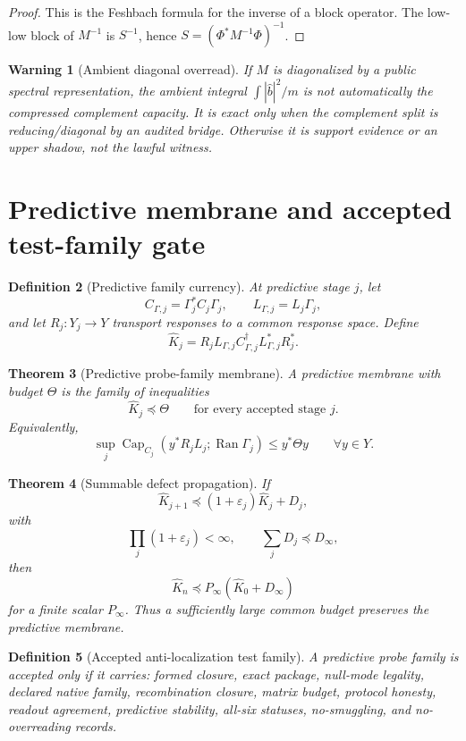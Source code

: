 \documentclass[11pt]{article}
\newtheorem{theorem}{Theorem}[section]
\newtheorem{definition}[theorem]{Definition}
\newtheorem{warning}[theorem]{Warning}
\DeclareMathOperator{\range}{Ran}
\DeclareMathOperator{\Capacity}{Cap}
\newcommand{\eps}{\varepsilon}
\begin{document}
\begin{proof}
This is the Feshbach formula for the inverse of a block operator.  The low-low block of \(M^{-1}\) is \(S^{-1}\), hence \(S=(\Phi^*M^{-1}\Phi)^{-1}\).
\end{proof}

\begin{warning}[Ambient diagonal overread]
If \(M\) is diagonalized by a public spectral representation, the ambient integral \(\int|\widehat b|^2/m\) is not automatically the compressed complement capacity.  It is exact only when the complement split is reducing/diagonal by an audited bridge.  Otherwise it is support evidence or an upper shadow, not the lawful witness.
\end{warning}

\section{Predictive membrane and accepted test-family gate}

\begin{definition}[Predictive family currency]
At predictive stage \(j\), let
\[
  C_{\Gamma,j}=\Gamma_j^*C_j\Gamma_j,
  \qquad L_{\Gamma,j}=L_j\Gamma_j,
\]
and let \(R_j:Y_j\to Y\) transport responses to a common response space.  Define
\[
  \widehat K_j=R_jL_{\Gamma,j}C_{\Gamma,j}^\dagger L_{\Gamma,j}^*R_j^*.
\]
\end{definition}

\begin{theorem}[Predictive probe-family membrane]
A predictive membrane with budget \(\Theta\) is the family of inequalities
\[
  \widehat K_j\preceq\Theta\qquad\text{for every accepted stage }j.
\]
Equivalently,
\[
  \sup_j \Capacity_{C_j}(y^*R_jL_j;\range\Gamma_j)\le y^*\Theta y
  \qquad\forall y\in Y.
\]
\end{theorem}

\begin{theorem}[Summable defect propagation]
If
\[
  \widehat K_{j+1}\preceq(1+\eps_j)\widehat K_j+D_j,
\]
with
\[
  \prod_j(1+\eps_j)<\infty,
  \qquad \sum_jD_j\preceq D_\infty,
\]
then
\[
  \widehat K_n\preceq P_\infty(\widehat K_0+D_\infty)
\]
for a finite scalar \(P_\infty\).  Thus a sufficiently large common budget preserves the predictive membrane.
\end{theorem}

\begin{definition}[Accepted anti-localization test family]
A predictive probe family is accepted only if it carries: formed closure, exact package, null-mode legality, declared native family, recombination closure, matrix budget, protocol honesty, readout agreement, predictive stability, all-six statuses, no-smuggling, and no-overreading records.
\end{definition}
\end{document}
